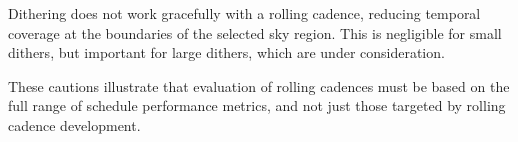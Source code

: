 Dithering does not work gracefully with a rolling cadence, reducing temporal coverage at the boundaries of the selected sky region.  This is negligible for small dithers, but important for large dithers, which are under consideration.

These cautions illustrate that evaluation of rolling cadences must be based on the full range of schedule performance metrics, and not just those targeted by rolling cadence development.


\navigationbar

% 
% 
% 
